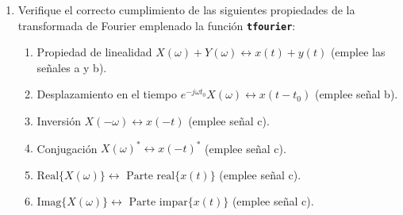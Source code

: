 \documentclass{article}
\newcommand{\code}[1]{\texttt{\textbf{#1}}}
\begin{document}
\begin{enumerate}[leftmargin=*]
\item Verifique el correcto cumplimiento de las siguientes propiedades de la transformada de Fourier emplenado la función \code{tfourier}:
\begin{enumerate}[label=\roman*)]
\item Propiedad de linealidad $X(\omega)+Y(\omega)\longleftrightarrow x(t)+y(t)$ (emplee las señales a y b).
\item Desplazamiento en el tiempo $e^{-j\omega t_0}X(\omega)\longleftrightarrow x(t-t_0)$ (emplee señal b).
\item Inversión $X(-\omega)\longleftrightarrow x(-t)$ (emplee señal c).
\item Conjugación $X(\omega)^*\longleftrightarrow x(-t)^*$ (emplee señal c).
\item $\mathrm{Real}\{X(\omega)\}\longleftrightarrow\text{ Parte real}\{x(t)\}$ (emplee señal c).
\item $\mathrm{Imag}\{X(\omega)\}\longleftrightarrow\text{ Parte impar}\{x(t)\}$ (emplee señal c).
\end{enumerate}
\end{enumerate}
\end{document}
